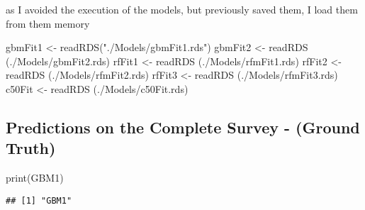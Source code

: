 \documentclass[
]{article}
\newenvironment{Shaded}{\begin{snugshade}}{\end{snugshade}}
\newcommand{\CommentTok}[1]{\textcolor[rgb]{0.56,0.35,0.01}{\textit{#1}}}
\newcommand{\FunctionTok}[1]{\textcolor[rgb]{0.00,0.00,0.00}{#1}}
\newcommand{\NormalTok}[1]{#1}
\newcommand{\OtherTok}[1]{\textcolor[rgb]{0.56,0.35,0.01}{#1}}
\newcommand{\SpecialCharTok}[1]{\textcolor[rgb]{0.00,0.00,0.00}{#1}}
\newcommand{\StringTok}[1]{\textcolor[rgb]{0.31,0.60,0.02}{#1}}
\begin{document}
as I avoided the execution of the models, but previously saved them, I
load them from them memory

\begin{Shaded}
\begin{Highlighting}[]
\NormalTok{gbmFit1 }\OtherTok{\textless{}{-}} \FunctionTok{readRDS}\NormalTok{(}\StringTok{"./Models/gbmFit1.rds"}\NormalTok{)}
\NormalTok{gbmFit2 }\OtherTok{\textless{}{-}} \FunctionTok{readRDS}\NormalTok{ (}\StringTok{\textquotesingle{}./Models/gbmFit2.rds\textquotesingle{}}\NormalTok{)}
\NormalTok{rfFit1 }\OtherTok{\textless{}{-}} \FunctionTok{readRDS}\NormalTok{ (}\StringTok{\textquotesingle{}./Models/rfmFit1.rds\textquotesingle{}}\NormalTok{)}
\NormalTok{rfFit2 }\OtherTok{\textless{}{-}} \FunctionTok{readRDS}\NormalTok{ (}\StringTok{\textquotesingle{}./Models/rfmFit2.rds\textquotesingle{}}\NormalTok{)}
\NormalTok{rfFit3 }\OtherTok{\textless{}{-}} \FunctionTok{readRDS}\NormalTok{ (}\StringTok{\textquotesingle{}./Models/rfmFit3.rds\textquotesingle{}}\NormalTok{)}
\NormalTok{c50Fit }\OtherTok{\textless{}{-}} \FunctionTok{readRDS}\NormalTok{ (}\StringTok{\textquotesingle{}./Models/c50Fit.rds\textquotesingle{}}\NormalTok{)}
\end{Highlighting}
\end{Shaded}

\hypertarget{predictions-on-the-complete-survey---ground-truth}{%
\subsection{Predictions on the Complete Survey - (Ground
Truth)}\label{predictions-on-the-complete-survey---ground-truth}}

\begin{Shaded}
\begin{Highlighting}[]
\FunctionTok{print}\NormalTok{(}\StringTok{\textquotesingle{}GBM1\textquotesingle{}}\NormalTok{)}
\end{Highlighting}
\end{Shaded}

\begin{verbatim}
## [1] "GBM1"
\end{verbatim}

\begin{Shaded}
\end{Shaded}
\end{document}
